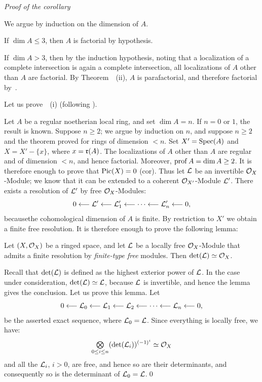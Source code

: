 \emph{Proof of the corollary}

We argue by induction on the dimension of $A$.

If $\dim A\leq 3$, then $A$ is factorial by hypothesis.

If $\dim A>3$, then by the induction hypothesis, noting that a localization of a complete intersection is again a complete intersection, all localizations of $A$ other than $A$ are factorial. By Theorem~~(ii), $A$ is parafactorial, and therefore factorial by~.

Let us prove~~(i) (following ).

Let $A$ be a regular noetherian local ring, and set $\dim A=n$. If $n=0$ or $1$, the result is known. Suppose $n\geq 2$; we argue by induction on $n$, and suppose $n\geq 2$ and the theorem proved for rings of dimension $<n$. Set $X'=\operatorname{Spec}(A)$ and $X=X'-\{x\}$, where $x=\mathfrak{r}(A)$. The localizations of $A$ other than $A$ are regular and of dimension $<n$, and hence factorial. Moreover, $\operatorname{prof} A = \dim A\geq 2$. It is therefore enough to prove that $\operatorname{Pic}(X)=0$ (cor\ptbl{}). Thus let ${\mathcal L}$ be an invertible $\mathcal O_X$-Module; we know that it can be extended to a coherent $\mathcal O_{X'}$-Module ${\mathcal L}'$. There exists a resolution of ${\mathcal L}'$ by free $\mathcal O_X$-Modules:
\[
0\longleftarrow {\mathcal L}'\longleftarrow {\mathcal L}'_1\longleftarrow\cdots\longleftarrow{\mathcal L}'_n\longleftarrow 0{},
\]
because\pageoriginale the cohomological dimension of $A$ is finite. By restriction to $X'$ we obtain a finite free resolution. It is therefore enough to prove the following lemma:

\begin{lemme} \label{XI.3.15} Let $(X, \mathcal O_X)$ be a ringed space, and let ${\mathcal L}$ be a locally free $\mathcal O_X$-Module that admits a finite resolution by \emph{finite-type free} modules. Then $\det({\mathcal L}) \simeq \mathcal O_X$.
\end{lemme}

Recall that $\det({\mathcal L})$ is defined as the highest exterior power of ${\mathcal L}$. In the case under consideration, $\det({\mathcal L}) \simeq{\mathcal L}$, because ${\mathcal L}$ is invertible, and hence the lemma gives the conclusion. Let us prove this lemma. Let
\[
0\longleftarrow {\mathcal L}_0\longleftarrow {\mathcal L}_1\longleftarrow {\mathcal L}_2\longleftarrow\cdots\longleftarrow{\mathcal L}_n\longleftarrow 0{},
\]
be the asserted exact sequence, where ${\mathcal L}_0={\mathcal L}$. Since everything is locally free, we have:
\[
\mathop{\textstyle\bigotimes}\limits_{0\leq i\leq n}(\det({\mathcal L}_i))^{(-1)^i} \simeq \mathcal O_X
\]
and all the ${\mathcal L}_i$, $i>0$, are free, and hence so are their determinants, and consequently so is the determinant of ${\mathcal L}_0 = {\mathcal L}$.\qed

